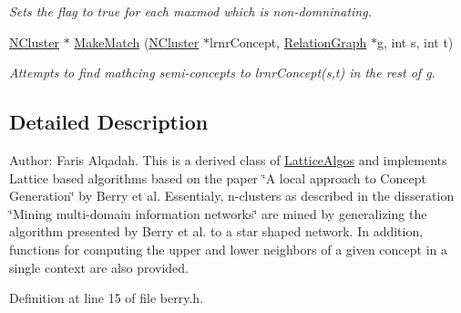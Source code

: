\begin{DoxyCompactItemize}
\begin{DoxyCompactList}\small\item\em Sets the flag to true for each maxmod which is non-\/domninating. \item\end{DoxyCompactList}\item 
\hyperlink{class_n_cluster}{NCluster} $\ast$ \hyperlink{class_berry_lattice_algos_a87c253892ac8350043390b5c373a25a0}{MakeMatch} (\hyperlink{class_n_cluster}{NCluster} $\ast$lrnrConcept, \hyperlink{class_relation_graph}{RelationGraph} $\ast$g, int s, int t)
\begin{DoxyCompactList}\small\item\em Attempts to find mathcing semi-\/concepts to lrnrConcept(s,t) in the rest of g. \item\end{DoxyCompactList}\end{DoxyCompactItemize}


\subsection{Detailed Description}
Author: Faris Alqadah. This is a derived class of \hyperlink{class_lattice_algos}{LatticeAlgos} and implements Lattice based algorithms based on the paper \char`\"{}A local approach to Concept Generation\char`\"{} by Berry et al. Essentialy, n-\/clusters as described in the disseration \char`\"{}Mining multi-\/domain information networks\char`\"{} are mined by generalizing the algorithm presented by Berry et al. to a star shaped network. In addition, functions for computing the upper and lower neighbors of a given concept in a single context are also provided. 

Definition at line 15 of file berry.h.




